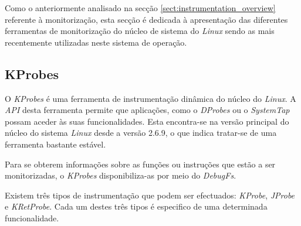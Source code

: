 Como o anteriormente analisado na secção \ref{sect:instrumentation_overview} referente à monitorização, esta secção é dedicada à apresentação das diferentes ferramentas de monitorização do núcleo de sistema do \textit{Linux} sendo as mais recentemente utilizadas neste sistema de operação.

\subsection{KProbes}\label{sect:KProbes_overview}

O \textit{KProbes} é uma ferramenta de instrumentação dinâmica do núcleo do \textit{Linux}.
A \textit{API} desta ferramenta permite que aplicações, como o \textit{DProbes} ou o \textit{SystemTap} possam aceder às suas funcionalidades.
Esta encontra-se na versão principal do núcleo do sistema \textit{Linux} desde a versão 2.6.9, o que indica tratar-se de uma ferramenta bastante estável\cite{kernel_debug_printk_on_fly,KProbesSite}.


Para se obterem informações sobre as funções ou instruções que estão a ser monitorizadas, o \textit{KProbes} disponibiliza-as por meio do \textit{DebugFs}.

Existem três tipos de instrumentação que podem ser efectuados: \textit{KProbe}, \textit{JProbe} e \textit{KRetProbe}.
Cada um destes três tipos é especifico de uma determinada funcionalidade.

